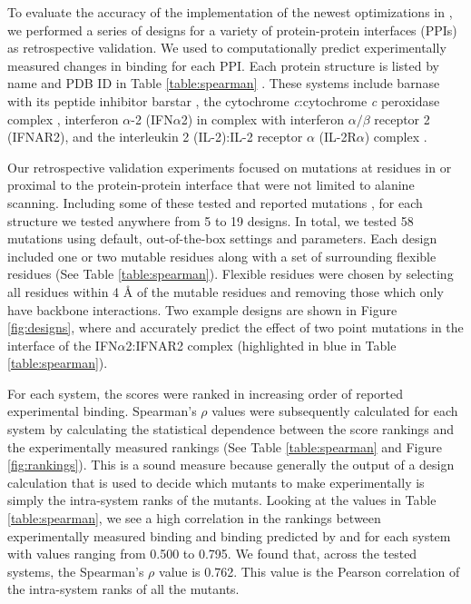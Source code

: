 To evaluate the accuracy of the implementation of the newest optimizations in , we performed a series of designs for a variety of protein-protein interfaces (PPIs) as retrospective validation. We used \ks \cite{K*} to computationally predict experimentally measured changes in binding for each PPI. Each protein structure is listed by name and PDB ID in Table \ref{table:spearman} \cite{pdb1x1u,pdb2pcb,pdb3s9d,pdb2b5i}.  These systems include barnase with its peptide inhibitor barstar \cite{binding2barnase,bindingbarnase}, the cytochrome {\it c}:cytochrome {\it c} peroxidase complex \cite{bindingcytc}, interferon $\alpha$-2 (IFN$\alpha$2) in complex with interferon $\alpha/\beta$ receptor 2 (IFNAR2)\cite{bindingifna2}, and the interleukin 2 (IL-2):IL-2 receptor $\alpha$ (IL-2R$\alpha$) complex \cite{bindingil2}.

Our retrospective validation experiments focused on mutations at residues in or proximal to the protein-protein interface that were not limited to alanine scanning. Including some of these tested and reported mutations \cite{binding2barnase,bindingbarnase,bindingcytc,bindingifna2,bindingil2}, for each structure we tested anywhere from 5 to 19 designs. In total, we tested 58 mutations using default, out-of-the-box  settings and parameters. Each design included one or two mutable residues along with a set of surrounding flexible residues (See Table \ref{table:spearman}). Flexible residues were chosen by selecting all residues within 4 {\AA} of the mutable residues and removing those which only have backbone interactions. Two example designs are shown in Figure \ref{fig:designs}, where  and \ks accurately predict the effect of two point mutations in the interface of the IFN$\alpha$2:IFNAR2 complex (highlighted in blue in Table \ref{table:spearman}). 

For each system, the \ks scores were ranked in increasing order of reported experimental binding. Spearman's $\rho$ values were subsequently calculated for each system by calculating the statistical dependence between the \ks score rankings and the experimentally measured rankings (See Table \ref{table:spearman} and Figure \ref{fig:rankings}). This is a sound measure because generally the output of a design calculation that is used to decide which mutants to make experimentally is simply the intra-system ranks of the mutants. Looking at the values in Table \ref{table:spearman}, we see a high correlation in the rankings between experimentally measured binding and binding predicted by  and \ks for each system with values ranging from 0.500 to 0.795. We found that, across the tested systems, the Spearman's $\rho$ value is 0.762. This value is the Pearson correlation of the intra-system ranks of all the mutants.      



